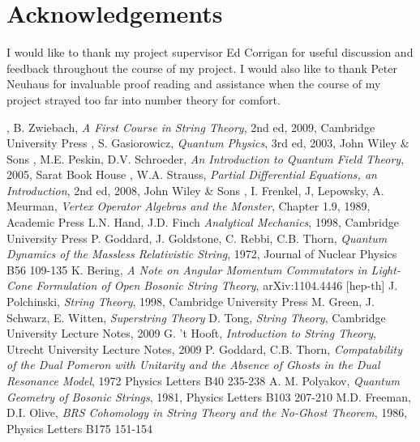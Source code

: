 \documentclass[a4paper,12pt]{article}
\numberwithin{equation}{section}
\begin{document}
\section{Acknowledgements}
I would like to thank my project supervisor Ed Corrigan for useful discussion and feedback throughout the course of my project. I would also like to thank Peter Neuhaus for invaluable proof reading and assistance when the course of my project strayed too far into number theory for comfort.

\begin{thebibliography}{99}

, B. Zwiebach, {\em A First Course in String Theory}, 2nd ed, 2009, Cambridge University Press
, S. Gasiorowicz, {\em Quantum Physics}, 3rd ed, 2003, John Wiley \& Sons
, M.E. Peskin, D.V. Schroeder, {\em An Introduction to Quantum Field Theory}, 2005, Sarat Book House
, W.A. Strauss, {\em Partial Differential Equations, an Introduction}, 2nd ed, 2008, John Wiley \& Sons
, I. Frenkel, J, Lepowsky, A. Meurman, {\em Vertex Operator Algebras and the Monster}, Chapter 1.9, 1989, Academic Press
 L.N. Hand, J.D. Finch {\em Analytical Mechanics}, 1998, Cambridge University Press
 P. Goddard, J. Goldstone, C. Rebbi, C.B. Thorn, {\em Quantum Dynamics of the Massless Relativistic String}, 1972, Journal of Nuclear Physics B56 109-135
 K. Bering, {\em A Note on Angular Momentum Commutators in Light-Cone Formulation of Open Bosonic String Theory}, arXiv:1104.4446 [hep-th]
 J. Polchinski, {\em String Theory}, 1998, Cambridge University Press
 M. Green, J. Schwarz, E. Witten, {\em Superstring Theory}
 D. Tong, {\em String Theory}, Cambridge University Lecture Notes, 2009
 G. 't Hooft, {\em Introduction to String Theory}, Utrecht University Lecture Notes, 2009
 P. Goddard, C.B. Thorn, {\em Compatability of the Dual Pomeron with Unitarity and the Absence of Ghosts in the Dual Resonance Model}, 1972 Physics Letters B40 235-238
 A. M. Polyakov, {\em Quantum Geometry of Bosonic Strings}, 1981, Physics Letters B103 207-210
 M.D. Freeman, D.I. Olive, {\em BRS Cohomology in String Theory and the No-Ghost Theorem}, 1986, Physics Letters B175 151-154
\end{thebibliography}
\end{document}
